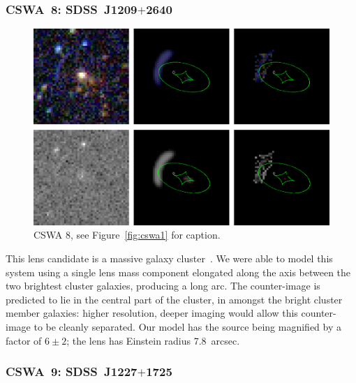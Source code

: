\documentclass[iop]{emulateapj}
\begin{document}
\subsubsection*{CSWA~8: SDSS\ J1209$+$2640}
\label{sec:results:indinotes:cswa8}


\begin{figure}[!ht]
	\centering\includegraphics[width=\linewidth]{figs/8.eps}
	\caption{CSWA 8, see Figure~\ref{fig:cswa1} for caption.}
	\label{fig:cswa8}
\end{figure}

This lens candidate is a massive galaxy cluster~\citep{OSK08}. We were able to
model this system using a single lens mass component elongated along the axis
between the  two brightest cluster galaxies, producing a long arc. The
counter-image is predicted to lie in the central part of the cluster, in amongst
the bright cluster member galaxies: higher resolution, deeper imaging would
allow this counter-image to be cleanly separated. Our model has the source being
magnified by a factor of $6\pm2$; the lens has Einstein radius 7.8~arcsec. 



\subsubsection*{CSWA~9: SDSS\ J1227$+$1725}
\label{sec:results:indinotes:cswa9}

\end{document}
